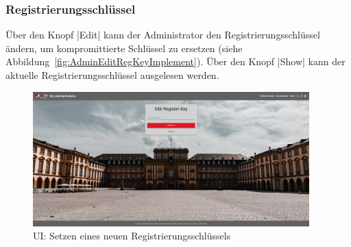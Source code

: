 \subsubsection*{Registrierungsschlüssel \faKey}

Über den Knopf \jinline|Edit| kann der Administrator den Registrierungsschlüssel ändern, um kompromittierte Schlüssel zu ersetzen (siehe Abbildung~\vref{fig:AdminEditRegKeyImplement}).
Über den Knopf \jinline|Show|\xspace kann der aktuelle Registrierungsschlüssel ausgelesen werden.

\begin{figure}[h]
	\centering
	\includegraphics[width=0.95\textwidth, keepaspectratio]{img/client/EditSurveyMasterKey.png}
	\captionsetup{justification=centering, format=plain}
	\caption[\acl{UI}: Setzen eines neuen Registrierungsschlüssels]{\acl{UI}: Setzen eines neuen Registrierungsschlüssels \\ \quelleScreenshot}
	\label{fig:AdminEditRegKeyImplement}
\end{figure}
